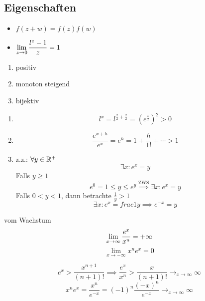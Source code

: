 \subsection{Eigenschaften}
\begin{itemize}
  \item $f(z+w)=f(z)f(w)$
  \item $\displaystyle\lim_{z\rightarrow0}\frac{l^z-1}{z}=1$
\end{itemize}
\begin{Sat}
  \begin{enumerate}
    \item positiv
    \item monoton steigend
    \item bijektiv
  \end{enumerate}
\end{Sat}
\begin{Bew}
  \begin{enumerate}
    \item \[l^x=l^{\frac{x}{2}+\frac{x}{2}} = (e^\frac{x}{2})^2>0\]
    \item \[\frac{e^{x+h}}{e^x}=e^h=1+\frac{h}{1!}+\cdots > 1\]
    \item z.z.: $\forall y\in\mathbb{R}^+$
      \[\exists x: e^x=y\]
      Falls $y\geq 1$
      \[e^0=1\leq y\leq e^y\stackrel{\text{ZWS}}{\implies}\exists x:e^x=y\]
      Falls $0<y<1$, dann betrachte $\frac{1}{y}>1$
      \[\exists x: e^x=frac{1}{y}\implies e^{-x}=y\]
  \end{enumerate}
\end{Bew}
\begin{Sat}{vom Wachstum}\label{s:wachstum1}
  \[\displaystyle\lim_{x\rightarrow\infty}\frac{e^x}{x^n}=+\infty\]
  \[\lim_{x\to-\infty}x^ne^x=0\]
\end{Sat}
\begin{Bew}
  \[e^x>\frac{x^{n+1}}{(n+1)!}\implies\frac{e^x}{x^n}>\frac{x}{(n+1)!}\to_{x\to\infty}\infty\]
  \[x^ne^x=\frac{x^n}{e^{-x}}=(-1)^n\frac{(-x)^n}{e^{-x}}\to_{x\to\infty}\infty\]
\end{Bew}
